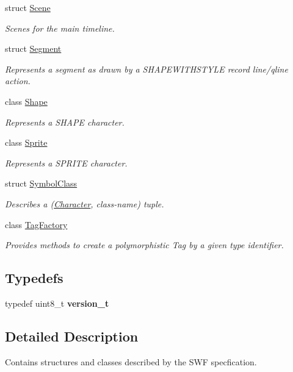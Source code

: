 \begin{DoxyCompactItemize}
struct \hyperlink{structjswf_1_1flash_1_1_scene}{Scene}
\begin{DoxyCompactList}\small\item\em Scenes for the main timeline. \end{DoxyCompactList}\item 
struct \hyperlink{structjswf_1_1flash_1_1_segment}{Segment}
\begin{DoxyCompactList}\small\item\em Represents a segment as drawn by a {\ttfamily S\+H\+A\+P\+E\+W\+I\+T\+H\+S\+T\+Y\+L\+E} record {\ttfamily line}/{\ttfamily qline} action. \end{DoxyCompactList}\item 
class \hyperlink{classjswf_1_1flash_1_1_shape}{Shape}
\begin{DoxyCompactList}\small\item\em Represents a {\ttfamily S\+H\+A\+P\+E} character. \end{DoxyCompactList}\item 
class \hyperlink{classjswf_1_1flash_1_1_sprite}{Sprite}
\begin{DoxyCompactList}\small\item\em Represents a {\ttfamily S\+P\+R\+I\+T\+E} character. \end{DoxyCompactList}\item 
struct \hyperlink{structjswf_1_1flash_1_1_symbol_class}{Symbol\+Class}
\begin{DoxyCompactList}\small\item\em Describes a ({\ttfamily \hyperlink{classjswf_1_1flash_1_1_character}{Character}}, class-\/name) tuple. \end{DoxyCompactList}\item 
class \hyperlink{classjswf_1_1flash_1_1_tag_factory}{Tag\+Factory}
\begin{DoxyCompactList}\small\item\em Provides methods to create a polymorphistic Tag by a given type identifier. \end{DoxyCompactList}\end{DoxyCompactItemize}
\subsection*{Typedefs}
\begin{DoxyCompactItemize}
\item 
\hypertarget{namespacejswf_1_1flash_adf73d84833c506260215262acfa273e7}{typedef uint8\+\_\+t {\bfseries version\+\_\+t}}\label{namespacejswf_1_1flash_adf73d84833c506260215262acfa273e7}

\end{DoxyCompactItemize}


\subsection{Detailed Description}
Contains structures and classes described by the S\+W\+F specfication. 